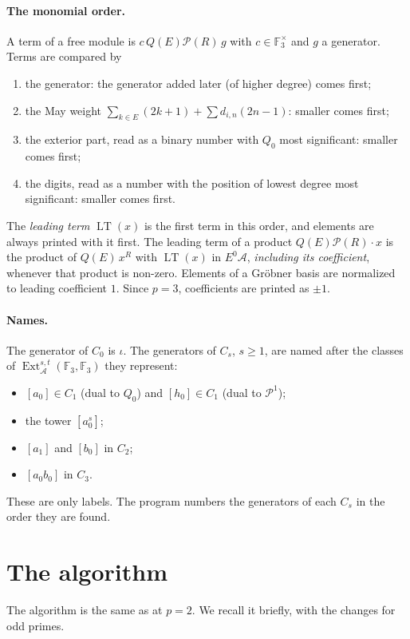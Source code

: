 \documentclass[11pt]{article}
\renewcommand{\P}{\mathcal{P}}
\newcommand{\F}{\mathbb{F}_3}
\newcommand{\A}{\mathcal{A}}
\DeclareMathOperator{\LT}{LT}
\DeclareMathOperator{\Ext}{Ext}
\begin{document}
\paragraph{The monomial order.}
A term of a free module is $c\, Q(E)\P(R)\, g$ with $c \in \F^\times$ and $g$ a generator.
Terms are compared by
\begin{enumerate}
\item the generator: the generator added later (of higher degree) comes first;
\item the May weight $\sum_{k \in E}(2k+1) + \sum d_{i,n}(2n - 1)$: smaller comes first;
\item the exterior part, read as a binary number with $Q_0$ most significant: smaller comes
  first;
\item the digits, read as a number with the position of lowest degree most significant:
  smaller comes first.
\end{enumerate}
The \emph{leading term} $\LT(x)$ is the first term in this order, and elements are always
printed with it first. The leading term of a product $Q(E)\P(R)\cdot x$ is the product of
$Q(E)\,x^R$ with $\LT(x)$ in $E^0\A$, \emph{including its coefficient}, whenever that product
is non-zero. Elements of a Gröbner basis are normalized to leading coefficient $1$. Since
$p = 3$, coefficients are printed as $\pm 1$.

\paragraph{Names.}
The generator of $C_0$ is $\iota$. The generators of $C_s$, $s \ge 1$, are named after the
classes of $\Ext_\A^{s,t}(\F, \F)$ they represent:
\begin{itemize}
\item $[a_0] \in C_1$ (dual to $Q_0$) and $[h_0] \in C_1$ (dual to $\P^1$);
\item the tower $[a_0^s]$;
\item $[a_1]$ and $[b_0]$ in $C_2$;
\item $[a_0b_0]$ in $C_3$.
\end{itemize}
These are only labels. The program numbers the generators of each $C_s$ in the order they are
found.

\section{The algorithm}

The algorithm is the same as at $p = 2$. We recall it briefly, with the changes for odd primes.
\end{document}
